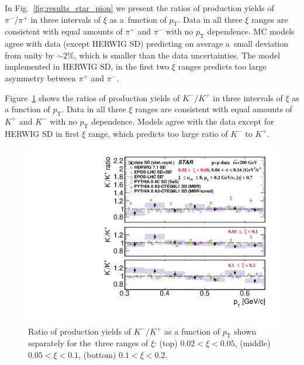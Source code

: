 In Fig.~\ref{fig:results_star_pion} we present the ratios of production yields of $\pi^-/\pi^+$ in three intervals of $\xi$ as a~function of $p_\textrm{T}$.
Data in all three $\xi$ ranges are consistent with equal amounts of $\pi^+$ and $\pi^-$ with no $p_\textrm{T}$ dependence.  MC models agree with data (except HERWIG SD) predicting on average a~small deviation from unity by $\sim 2\%$, which is smaller than the data uncertainties. The model implemented in HERWIG SD, in the first two $\xi$ ranges predicts too large asymmetry between $\pi^+$ and $\pi^-$.

Figure~\ref{fig:results_star_kaon} shows the ratios of production yields of $K^-/K^+$ in three intervals of $\xi$ as a function of $p_\textrm{T}$.
Data in all three $\xi$ ranges are consistent with equal amounts of $K^+$ and $K^-$ with no $p_\textrm{T}$ dependence. Models agree with the data except for HERWIG SD in first $\xi$ range, which predicts too large ratio of $K^-$ to $K^+$.
\begin{figure}[b!]
	\centering
	\includegraphics[width=.99\textwidth,page=1]{chapters/chrgSTAR/img/results/particleRatio_prt_1.pdf}
	\caption{Ratio of production yields of $K^-/K^+$ as a function of $p_\textrm{T}$ shown separately for the~three ranges of $\xi$: (top) $0.02<\xi<0.05$, (middle) $0.05<\xi<0.1$, (bottom) $0.1<\xi<0.2$.}
	\label{fig:results_star_kaon}
	
\end{figure}

